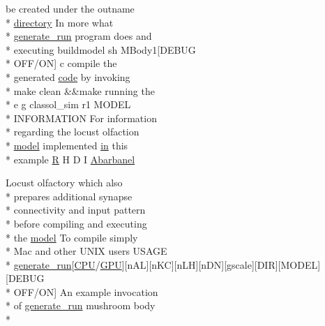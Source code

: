 \begin{DoxyCompactItemize}
be created under the outname \\*
\hyperlink{README_8txt_ae619b68020535fba5ac79522a0d9d1c4}{directory} In more what \\*
\hyperlink{userproject_2MBody__userdef__project_2README_8txt_a320a215d1e27b4de394be70e90d22863}{generate\+\_\+run} program does and \\*
executing buildmodel sh M\+Body1\mbox{[}D\+E\+B\+U\+G \\*
O\+F\+F/O\+N\mbox{]} c compile the \\*
generated \hyperlink{userproject_2MBody__userdef__project_2README_8txt_aeec4e596748e7c29dd5548dae4c70685}{code} by invoking \\*
make clean \&\&make running the \\*
e g classol\+\_\+sim r1 M\+O\+D\+E\+L \\*
I\+N\+F\+O\+R\+M\+A\+T\+I\+O\+N For information \\*
regarding the locust olfaction \\*
\hyperlink{README_8txt_a69fd801b7213948c12d9dd7eebb3ed14}{model} implemented \hyperlink{README_8txt_a148897a6b2cc9cff25af80abb13426b0}{in} this \\*
example \hyperlink{gen__syns__sparse__izhModel_8cc_ac06fcc1e53c6b21275aec67047473a28}{R} H D I \hyperlink{userproject_2MBody1__project_2README_8txt_a0954e396941fea721eadcc406fea7fd7}{Abarbanel}
\item 
Locust olfactory which also \\*
prepares additional synapse \\*
connectivity and input pattern \\*
before compiling and executing \\*
the \hyperlink{README_8txt_a69fd801b7213948c12d9dd7eebb3ed14}{model} To compile simply \\*
Mac and other U\+N\+I\+X users U\+S\+A\+G\+E \\*
\hyperlink{userproject_2MBody__userdef__project_2README_8txt_a320a215d1e27b4de394be70e90d22863}{generate\+\_\+run}\mbox{[}\hyperlink{README_8txt_a74a069e3c75797de2636c4dd14daa147}{C\+P\+U}/\hyperlink{modelSpec_8h_a39cb9803524b6f3b783344b2f89867b4}{G\+P\+U}\mbox{]}\mbox{[}n\+A\+L\mbox{]}\mbox{[}n\+K\+C\mbox{]}\mbox{[}n\+L\+H\mbox{]}\mbox{[}n\+D\+N\mbox{]}\mbox{[}gscale\mbox{]}\mbox{[}D\+I\+R\mbox{]}\mbox{[}M\+O\+D\+E\+L\mbox{]}\mbox{[}D\+E\+B\+U\+G \\*
O\+F\+F/O\+N\mbox{]} An example invocation \\*
of \hyperlink{userproject_2MBody__userdef__project_2README_8txt_a320a215d1e27b4de394be70e90d22863}{generate\+\_\+run} mushroom body \\*

\end{DoxyCompactItemize}
